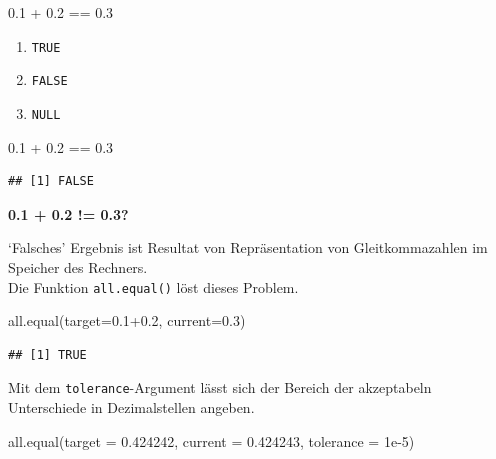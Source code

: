 \documentclass[
]{book}
\newenvironment{Shaded}{\begin{snugshade}}{\end{snugshade}}
\newcommand{\AttributeTok}[1]{\textcolor[rgb]{0.77,0.63,0.00}{#1}}
\newcommand{\FloatTok}[1]{\textcolor[rgb]{0.00,0.00,0.81}{#1}}
\newcommand{\FunctionTok}[1]{\textcolor[rgb]{0.00,0.00,0.00}{#1}}
\newcommand{\NormalTok}[1]{#1}
\newcommand{\SpecialCharTok}[1]{\textcolor[rgb]{0.00,0.00,0.00}{#1}}
\providecommand{\tightlist}{%
  \setlength{\itemsep}{0pt}\setlength{\parskip}{0pt}}
\begin{document}
\begin{Shaded}
\begin{Highlighting}[]
\FloatTok{0.1} \SpecialCharTok{+} \FloatTok{0.2} \SpecialCharTok{==} \FloatTok{0.3}
\end{Highlighting}
\end{Shaded}

\begin{enumerate}
\def\labelenumi{\Alph{enumi})}
\tightlist
\item
  \texttt{TRUE}
\item
  \texttt{FALSE}
\item
  \texttt{NULL}
\end{enumerate}

\begin{Shaded}
\begin{Highlighting}[]
\FloatTok{0.1} \SpecialCharTok{+} \FloatTok{0.2} \SpecialCharTok{==} \FloatTok{0.3}
\end{Highlighting}
\end{Shaded}

\begin{verbatim}
## [1] FALSE
\end{verbatim}

\textbf{0.1 + 0.2 != 0.3?}

`Falsches' Ergebnis ist Resultat von Repräsentation von Gleitkommazahlen im Speicher des Rechners.\\
Die Funktion \texttt{all.equal()} löst dieses Problem.

\begin{Shaded}
\begin{Highlighting}[]
\FunctionTok{all.equal}\NormalTok{(}\AttributeTok{target=}\FloatTok{0.1+0.2}\NormalTok{, }\AttributeTok{current=}\FloatTok{0.3}\NormalTok{)}
\end{Highlighting}
\end{Shaded}

\begin{verbatim}
## [1] TRUE
\end{verbatim}

Mit dem \texttt{tolerance}-Argument lässt sich der Bereich der akzeptabeln Unterschiede in Dezimalstellen angeben.

\begin{Shaded}
\begin{Highlighting}[]
\FunctionTok{all.equal}\NormalTok{(}\AttributeTok{target =} \FloatTok{0.424242}\NormalTok{, }\AttributeTok{current =} \FloatTok{0.424243}\NormalTok{,}
          \AttributeTok{tolerance =} \FloatTok{1e{-}5}\NormalTok{)}
\end{Highlighting}
\end{Shaded}
\end{document}
